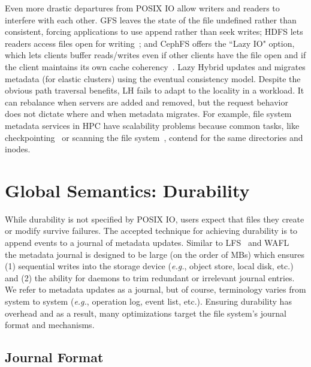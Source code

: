 Even more drastic departures from POSIX IO allow writers and readers to
interfere with each other. GFS leaves the state of the file undefined rather
than consistent, forcing applications to use append rather than seek writes;
HDFS lets readers access files open for
writing~\cite{hakimzadeh:dais14-hdfs-consistency}; and CephFS offers the ``Lazy
IO" option, which lets clients buffer reads/writes even if other clients have
the file open and if the client maintains its own cache
coherency~\cite{docs:cephcaps}.  Lazy Hybrid updates and migrates metadata (for
elastic clusters) using the eventual consistency model.
Despite the obvious path traversal benefits, LH fails to adapt to the
locality in a workload. It can rebalance when servers are added and removed,
but the request behavior does not dictate where and when metadata migrates.
For example, file system metadata services in HPC have scalability problems
because common tasks, like checkpointing~\cite{bent_plfs_2009} or scanning the
file system~\cite{zheng:pdsw2014-batchfs}, contend for the same directories and
inodes.

\section{Global Semantics: Durability}

While durability is not specified by POSIX IO, users expect that files they
create or modify survive failures. The accepted technique for achieving
durability is to append events to a journal of metadata updates.  Similar to
LFS~\cite{rosenblum:acm1992-LFS} and WAFL~\cite{hitz:wtec1994-WAFL} the
metadata journal is designed to be large (on the order of MBs) which ensures
(1) sequential writes into the storage device ({\it e.g.}, object store, local
disk, etc.) and (2) the ability for daemons to trim redundant or irrelevant
journal entries. We refer to metadata updates as a journal, but of course,
terminology varies from system to system ({\it e.g.}, operation log, event
list, etc.). Ensuring durability has overhead and as a result, many
optimizations target the file system's journal format and mechanisms.

\subsection{Journal Format}


